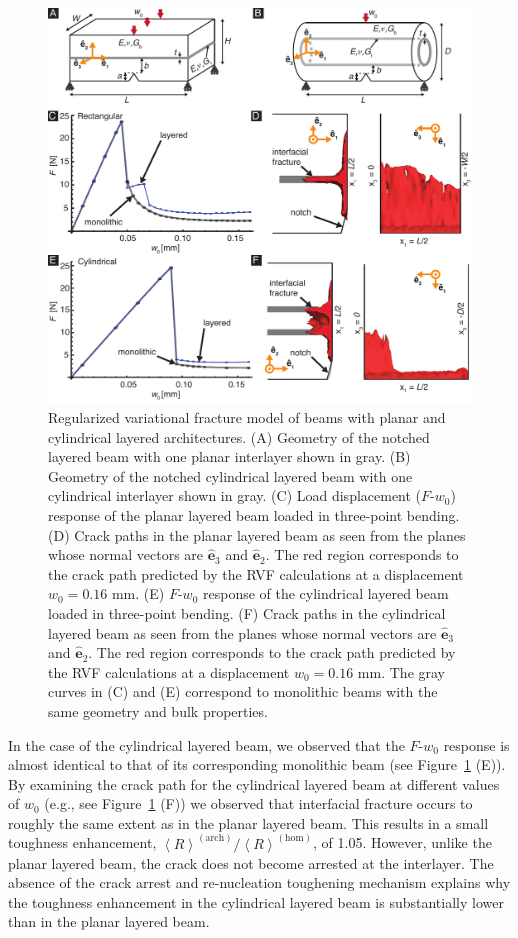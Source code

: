 \documentclass[12pt,onecolumn]{article}
\newcommand{\ey}{{\bm{\hat{e}}}_2}
\newcommand{\ez}{{\bm{\hat{e}}}_3}
\begin{document}
\begin{bibunit}
			\begin{figure}[ht!]
			\includegraphics[width=\textwidth]{../Figures/FigureVRF/FigureVRF_V3.pdf}
			\caption{Regularized variational fracture model of beams with planar and cylindrical layered architectures. (A) Geometry of the notched layered beam with one planar interlayer shown in gray. (B) Geometry of the notched cylindrical layered beam with one cylindrical interlayer shown in gray. (C) Load displacement ($F$-$w_0$) response of the planar layered beam loaded in three-point bending.  (D) Crack paths in the planar layered beam as seen from the planes whose normal vectors are $\ez$ and $\ey$. The red region corresponds to the crack path predicted by the RVF calculations at a displacement $w_0=0.16$ mm. (E) $F$-$w_0$ response of the cylindrical layered beam loaded in three-point bending.  (F) Crack paths in the cylindrical layered beam as seen from the planes whose normal vectors are $\ez$ and $\ey$. The red region corresponds to the crack path predicted by the RVF calculations at a displacement $w_0=0.16$ mm. The gray curves in (C) and (E) correspond to monolithic beams with the same geometry and bulk properties.}
			\label{fig:VF}
			\end{figure}

In the case of the cylindrical layered beam, we observed that the $F$-$w_0$ response is almost identical to that of its corresponding monolithic beam (see Figure~\ref{fig:VF} (E)). By examining the crack path for the cylindrical layered beam at different values of $w_0$ (e.g., see Figure~\ref{fig:VF} (F)) we observed that interfacial fracture occurs to roughly the same extent as in the planar layered beam. This results in a small toughness enhancement, $\left< R\right>^{(\mathrm{arch})}/\left< R\right>^{(\mathrm{hom})}$, of 1.05. However, unlike the planar layered beam, the crack does not become arrested at the interlayer. The absence of the crack arrest and re-nucleation toughening mechanism explains why the toughness enhancement in the cylindrical layered beam is substantially lower than in the planar layered beam.


\end{bibunit}
\end{document}
